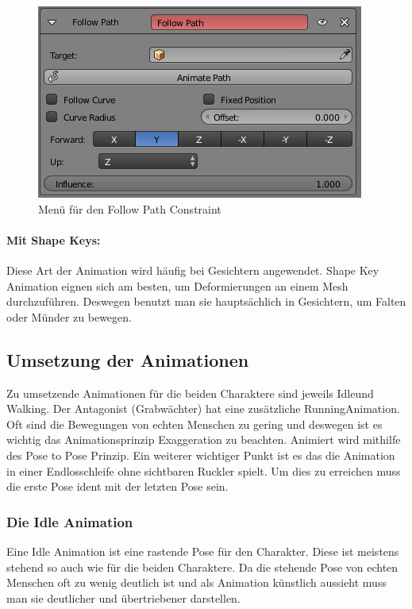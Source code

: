 \begin{figure}[H]
    \centering

    \includegraphics[width=.8\textwidth]{images/animation_path_constraint.png}
    \caption{Menü für den Follow Path Constraint}
\end{figure}

\paragraph{Mit Shape Keys:}
Diese Art der Animation wird häufig bei Gesichtern angewendet. Shape Key Animation eignen sich am besten, um Deformierungen an einem Mesh durchzuführen.
Deswegen benutzt man sie hauptsächlich in Gesichtern, um Falten oder Münder zu bewegen.
\citep{Blender:ShapeKeys}

\subsection{Umsetzung der Animationen}
Zu umsetzende Animationen für die beiden Charaktere sind jeweils \dq Idle\dq und \dq Walking\dq. Der Antagonist (Grabwächter)
hat eine zusätzliche \dq Running\dq Animation. Oft sind die Bewegungen von echten Menschen zu gering und deswegen ist es wichtig das Animationsprinzip \dq Exaggeration\dq
zu beachten. Animiert wird mithilfe des Pose to Pose Prinzip. Ein weiterer wichtiger Punkt ist es das die Animation in einer Endlosschleife
ohne sichtbaren Ruckler spielt. Um dies zu erreichen muss die erste Pose ident mit der letzten Pose sein.

\subsubsection{Die Idle Animation}
Eine Idle Animation ist eine rastende Pose für den Charakter. Diese ist meistens stehend so auch wie für die beiden Charaktere.
Da die stehende Pose von echten Menschen oft zu wenig deutlich ist und als Animation künstlich aussieht muss man sie deutlicher und übertriebener darstellen.

